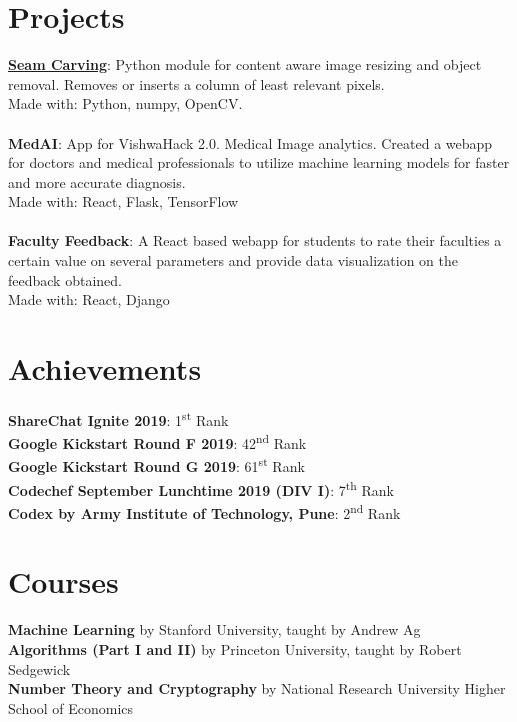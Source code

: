 \documentclass[margin, centered]{res}
\begin{document}
\begin{resume}
		\section{Projects}
			\textbf{\href{https://github.com/Spellstaker/Seam-Carving}{Seam Carving}}:
			Python module for content aware image resizing and object removal.
			Removes or inserts a column of least relevant pixels.\\
			Made with: Python, numpy, OpenCV.
			\\ \\
			\textbf{MedAI}:
			App for VishwaHack 2.0. Medical Image analytics. Created a webapp for doctors and medical professionals to utilize machine learning models for faster and more accurate diagnosis.\\
			Made with: React, Flask, TensorFlow
			\\ \\
			\textbf{Faculty Feedback}:
			A React based webapp for students to rate their faculties a certain value on several parameters
			and provide data visualization on the feedback obtained.\\
			Made with: React, Django
		
		\section{Achievements}
			\textbf{ShareChat Ignite 2019}: 1\textsuperscript{st} Rank\\
			\textbf{Google Kickstart Round F 2019}: 42\textsuperscript{nd} Rank\\
			\textbf{Google Kickstart Round G 2019}: 61\textsuperscript{st} Rank\\
			\textbf{Codechef  September Lunchtime 2019 (DIV I)}: 7\textsuperscript{th} Rank\\
			\textbf{Codex by Army Institute of Technology, Pune}: 2\textsuperscript{nd} Rank
		
		\section{Courses}
			\textbf{Machine Learning} by Stanford University, taught by Andrew Ag\\
			\textbf{Algorithms (Part I and II)} by Princeton University, taught by Robert Sedgewick\\
			\textbf{Number Theory and Cryptography} by National Research University Higher School of Economics 
		

\end{resume}
\end{document}
